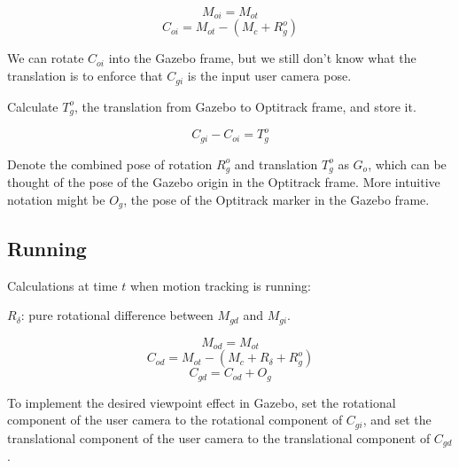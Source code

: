 \documentclass[11pt, letterpaper]{article}
\begin{document}
\[M_{oi} = M_{ot}\]
\[C_{oi} = M_{ot} - (M_c + R^o_g)\]

We can rotate $C_{oi}$ into the Gazebo frame, but we still don't know what the translation is to enforce that $C_{gi}$ is the input user camera pose.

Calculate $T^o_g$, the translation from Gazebo to Optitrack frame, and store it.

\[C_{gi} - C_{oi} = T^o_g\]

Denote the combined pose of rotation $R^o_g$ and translation $T^o_g$ as $G_o$, which can be thought of the pose of the Gazebo origin in the Optitrack frame. More intuitive notation might be $O_g$, the pose of the Optitrack marker in the Gazebo frame.

\subsection{Running}
Calculations at time $t$ when motion tracking is running:

$R_{\delta}$: pure rotational difference between $M_{gd}$ and $M_{gi}$.

\[M_{od} = M_{ot}\]
\[C_{od} = M_{ot} - (M_c + R_{\delta} + R^o_g)\]
\[C_{gd} = C_{od} + O_g\]

To implement the desired viewpoint effect in Gazebo, set the rotational component of the user camera to the rotational component of $C_{gi}$, and set the translational component of the user camera to the translational component of $C_{gd}$.
\end{document}
